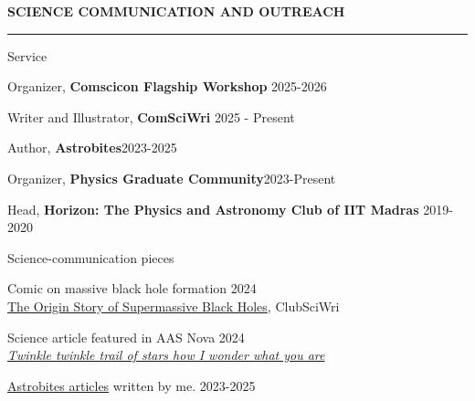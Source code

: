\documentclass{resume} %
\renewenvironment{rSection}[1]{
\sectionskip
\textbf{\textcolor{C2}{\MakeUppercase{#1}}}
\sectionlineskip
\hrule
\begin{list}{}{
\setlength{\leftmargin}{1.5em}
}
\item[]
}{
\end{list}
}
\begin{document}
\begin{rSection}{Science communication and outreach}
    \begin{rSubsection}{Service}{}{}{}
    \item Organizer, {\color{C3} \textbf{Comscicon Flagship Workshop}} \hfill 2025-2026
    \item Writer and Illustrator, {\color{C3} \textbf{ComSciWri}} \hfill 2025 - Present
    \item Author, {\color{C3} \textbf{Astrobites}}\hfill 2023-2025
    \item Organizer, {\color{C3} \textbf{Physics Graduate Community}}\hfill 2023-Present
    \item Head, {\color{C3} \textbf{Horizon: The Physics and Astronomy Club of IIT Madras}} \hfill 2019-2020
    \end{rSubsection}

    \begin{rSubsection}{Science-communication pieces}{}{}{}
    \item Comic on massive black hole formation \hfill 2024\\
    \href{https://sciwri.club/archives/13482}{The Origin Story of Supermassive Black Holes}, ClubSciWri
    \item Science article featured in AAS Nova \hfill 2024\\ \href{https://aasnova.org/2023/09/05/twinkle-twinkle-trail-of-stars-how-i-wonder-what-you-are/}{\em Twinkle twinkle trail of stars how I wonder what you are}
    \item \href{https://astrobites.org/author/psatheesh/}{Astrobites articles} written by me. \hfill 2023-2025
    \end{rSubsection}


\end{rSection}
\end{document}
